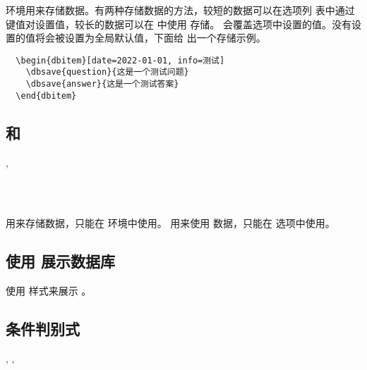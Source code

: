 \documentclass[full]{l3doc}
\begin{document}
\begin{documentation}
   环境用来存储数据。有两种存储数据的方法，较短的数据可以在选项列
  表中通过键值对设置值，较长的数据可以在  中使用  存储。
  会覆盖选项中设置的值。没有设置的值将会被设置为全局默认值，下面给
  出一个存储示例。

\begin{verbatim}
  \begin{dbitem}[date=2022-01-01, info=测试]
    \dbsave{question}{这是一个测试问题}
    \dbsave{answer}{这是一个测试答案}
  \end{dbitem}
\end{verbatim}

\subsection{ 和 }

\begin{function}{\dbsave, \dbuse}
  \begin{syntax}
       \\
       \\
  \end{syntax}

   用来存储数据，只能在  环境中使用。 用来使用
  数据，只能在  选项中使用。
\end{function}

\subsection{使用  展示数据库}

\begin{function}{\dbshow}
  \begin{syntax}
      
  \end{syntax}

  使用  样式来展示 。
\end{function}

\subsection{条件判别式}

\begin{function}{\dbIfEmptyT, \dbIfEmptyF, \dbIfEmptyTF}
  \begin{syntax}
       \\
      \\
     
  \end{syntax}


\end{function}
\end{documentation}
\end{document}
